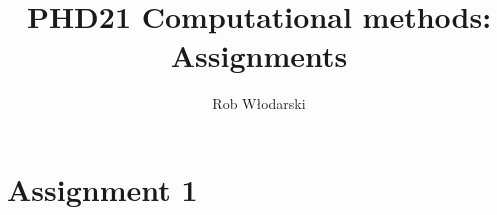 \documentclass[11pt]{article}
\numberwithin{equation}{section}
\begin{document}
\title{\Large \bfseries \vspace{-5mm} PHD21 Computational methods: Assignments \vspace{-5mm}}
\author{Rob Włodarski}
\date{}
\maketitle

\tableofcontents
\newpage


\section{Assignment 1}



%
%
%


%
%
%


\printbibliography
\end{document}
